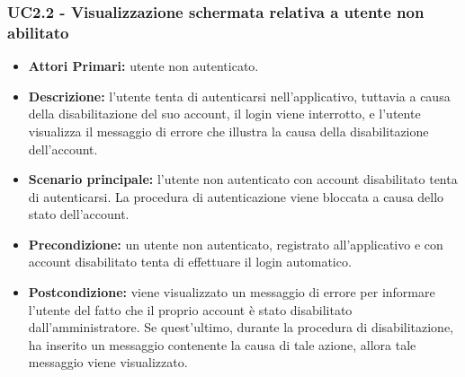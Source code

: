 \subsubsection{ UC2.2 - Visualizzazione schermata relativa a utente non abilitato}
\begin{itemize}
	\item\textbf{Attori Primari:} utente non autenticato.
	\item\textbf{Descrizione:} l'utente tenta di autenticarsi nell'applicativo, tuttavia a causa della disabilitazione del suo account, il login viene interrotto, e
	l'utente visualizza il messaggio di errore che illustra la causa della disabilitazione dell'account.
	\item\textbf{Scenario principale:} l’utente non autenticato con account disabilitato tenta di autenticarsi. 
	La procedura di autenticazione viene bloccata a causa dello stato dell'account.
	\item\textbf{Precondizione:} un utente non autenticato, registrato all'applicativo e con account disabilitato tenta di effettuare il login automatico. 
	\item\textbf{Postcondizione:} viene visualizzato un messaggio di errore per informare l'utente del fatto che il 
	proprio account è stato disabilitato dall'amministratore. Se quest'ultimo, durante la procedura di disabilitazione, ha inserito un messaggio contenente la causa di tale azione, allora tale messaggio viene visualizzato.
\end{itemize}

